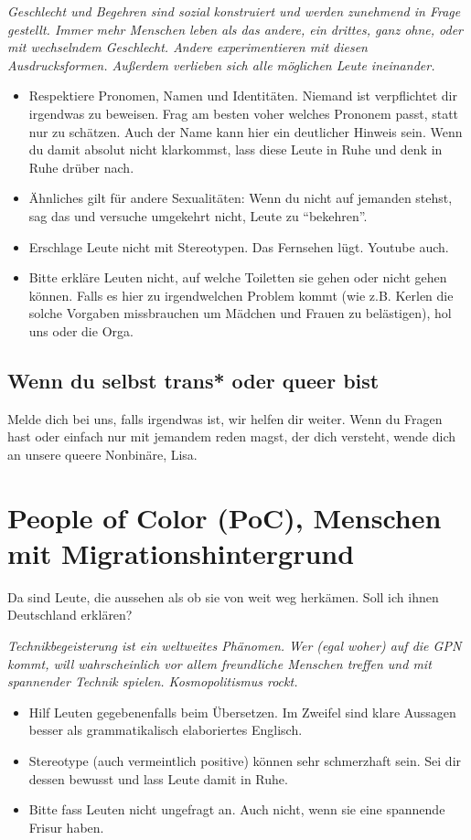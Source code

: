 \documentclass[10pt,foldmark]{leaflet}
\newcommand\dos{\item[$+$]}
\newcommand\donts{\item[$-$]}
\begin{document}
\emph{Geschlecht und Begehren sind sozial konstruiert und werden
  zunehmend in Frage gestellt. Immer mehr Menschen leben als das
  andere, ein drittes, ganz ohne, oder mit wechselndem
  Geschlecht. Andere experimentieren mit diesen
  Ausdrucksformen. Außerdem verlieben sich alle möglichen Leute
  ineinander.}
\label{sec-5-1}
\begin{itemize}
\dos Respektiere Pronomen, Namen und Identitäten. Niemand ist
  verpflichtet dir irgendwas zu beweisen. Frag am besten voher welches
  Prononem passt, statt nur zu schätzen. Auch der Name kann hier ein
  deutlicher Hinweis sein. Wenn du damit absolut nicht klarkommst,
  lass diese Leute in Ruhe und denk in Ruhe drüber nach.
\dos Ähnliches gilt für andere Sexualitäten: Wenn du nicht auf
  jemanden stehst, sag das und versuche umgekehrt nicht, Leute zu
  ``bekehren''.
\donts Erschlage Leute nicht mit Stereotypen. Das Fernsehen
  lügt. Youtube auch.
\donts Bitte erkläre Leuten nicht, auf welche Toiletten sie gehen oder
  nicht gehen können. Falls es hier zu irgendwelchen Problem kommt
  (wie z.B. Kerlen die solche Vorgaben missbrauchen um Mädchen und Frauen
  zu belästigen), hol uns oder die Orga.
\end{itemize}
\subsection{Wenn du selbst trans* oder queer bist}
Melde dich bei uns, falls irgendwas ist, wir helfen dir weiter. Wenn
du Fragen hast oder einfach nur mit jemandem reden magst, der dich
versteht, wende dich an unsere queere Nonbinäre, Lisa.




\section{People of Color (PoC), Menschen mit
  Migrationshintergrund}
\label{sec-4}
Da sind Leute, die aussehen als ob sie von weit weg herkämen. Soll ich
ihnen Deutschland erklären?

\emph{Technikbegeisterung ist ein weltweites Phänomen. Wer (egal
  woher) auf die GPN kommt, will wahrscheinlich vor allem freundliche
  Menschen treffen und mit spannender Technik spielen.
  Kosmopolitismus rockt.}
\label{sec-4-2}
\begin{itemize}
\dos Hilf Leuten gegebenenfalls beim Übersetzen. Im Zweifel sind
  klare Aussagen besser als grammatikalisch elaboriertes Englisch.
\donts Stereotype (auch vermeintlich positive) können sehr schmerzhaft
  sein. Sei dir dessen bewusst und lass Leute damit in Ruhe.
\donts Bitte fass Leuten nicht ungefragt an. Auch nicht, wenn sie eine
  spannende Frisur haben.
\end{itemize}
\end{document}
